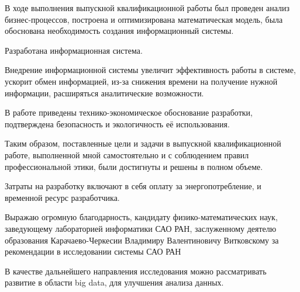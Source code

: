 В ходе выполнения выпускной квалификационной работы был проведен анализ бизнес-процессов, построена и оптимизирована математическая модель, была обоснована необходимость создания информационный системы.

Разработана информационная система.

Внедрение информационной системы увеличит эффективность работы в системе, ускорит обмен информацией, из-за снижения времени на получение нужной информации, расширяться аналитические возможности.

В работе приведены технико-экономическое обоснование разработки, подтверждена безопасность и экологичность её использования.

Таким образом, поставленные цели и задачи в выпускной квалификационной работе, выполненной мной самостоятельно и с соблюдением правил профессиональной этики, были достигнуты и решены в полном объеме.

Затраты на разработку включают в себя оплату за энергопотребление, и временной ресурс разработчика.   

Выражаю огромную благодарность, кандидату физико-математических наук, заведующему лабораторией информатики САО РАН, заслуженному деятелю образования Карачаево-Черкесии Владимиру Валентиновичу Витковскому за рекомендации в исследовании системы САО РАН   

В качестве дальнейшего направления исследования можно рассматривать развитие в области big data, для улучшения анализа данных. 

\pagebreak